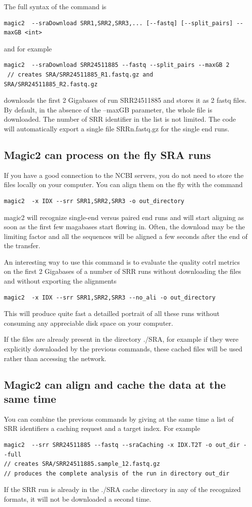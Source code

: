 \documentclass[11pt]{article}
\newcommand{\BL}{\begin{lstlisting}}
\begin{document}
The full syntax of the command is
\BL
magic2  --sraDownload SRR1,SRR2,SRR3,... [--fastq] [--split_pairs] --maxGB <int>
\end{lstlisting}
 and for example
\BL
magic2  --sraDownload SRR24511885 --fastq --split_pairs --maxGB 2
 // creates SRA/SRR24511885_R1.fastq.gz and SRA/SRR24511885_R2.fastq.gz  
\end{lstlisting}
downloads the first 2 Gigabases of run SRR24511885 and stores it as 2 fastq files.
By default, in the absence of the --maxGB parameter, the whole file is downloaded.
The number of SRR identifier in the list is not limited.
The code will automatically export a single file SRRn.fastq.gz for the single end runs.

\subsection {Magic2 can process on the fly SRA runs}

If you have a good connection to the NCBI servers, you do not need to store the files
locally on your computer. You can align them on the fly with the command
\BL
magic2  -x IDX --srr SRR1,SRR2,SRR3 -o out_directory 
\end{lstlisting}
magic2 will recognize single-end versus paired end runs and will start aligning
as soon as the first few magabases start flowing in.
Often, the download may be the limiting factor
and all the sequences will be aligned a few seconds after the end of the transfer.

An interesting way to use this command is to evaluate the quality cotrl metrics
on the first 2 Gigabases of a number of SRR runs without downloading the files and
without exporting the alignments
\BL
magic2  -x IDX --srr SRR1,SRR2,SRR3 --no_ali -o out_directory 
\end{lstlisting}
This will produce quite fast a detailled portrait of all these runs without
consuming any appreciable disk space on your computer.

If the files are already present in the directory ./SRA, for example if they
were explicitly downloaded by the previous commands, these cached files will
be used rather than accessing the network.

\subsection {Magic2 can align and cache the data at the same time}

You can combine the previous commands by giving at the same time a list of SRR identifiers
a caching request and a target index. For example
\BL
magic2  --srr SRR24511885 --fastq --sraCaching -x IDX.T2T -o out_dir --full
// creates SRA/SRR24511885.sample_12.fastq.gz
// produces the complete analysis of the run in directory out_dir
\end{lstlisting}
If the SRR run is already in the ./SRA cache directory  in any of the recognized formats,
it will not be downloaded a second time.
\end{document}
